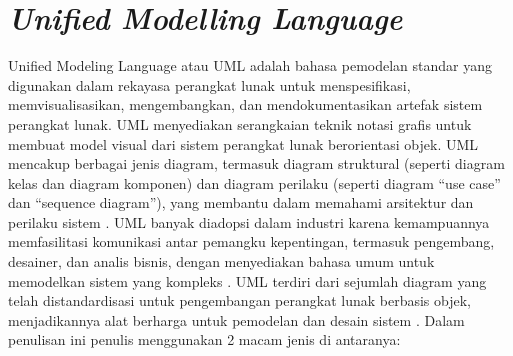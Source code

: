 \section{\textit{Unified Modelling Language}}
Unified Modeling Language atau UML adalah bahasa pemodelan standar yang digunakan dalam rekayasa perangkat lunak untuk menspesifikasi, memvisualisasikan, mengembangkan, dan mendokumentasikan artefak sistem perangkat lunak. UML menyediakan serangkaian teknik notasi grafis untuk membuat model visual dari sistem perangkat lunak berorientasi objek. UML mencakup berbagai jenis diagram, termasuk diagram struktural (seperti diagram kelas dan diagram komponen) dan diagram perilaku (seperti diagram ``use case'' dan ``sequence diagram''), yang membantu dalam memahami arsitektur dan perilaku sistem \citep{huzar2005uml}.
\singlespacing{}
UML banyak diadopsi dalam industri karena kemampuannya memfasilitasi komunikasi antar pemangku kepentingan, termasuk pengembang, desainer, dan analis bisnis, dengan menyediakan bahasa umum untuk memodelkan sistem yang kompleks \citep{huzar2005uml}.
\singlespacing{}
UML terdiri dari sejumlah diagram yang telah distandardisasi untuk pengembangan perangkat lunak berbasis objek, menjadikannya alat berharga untuk pemodelan dan desain sistem \citep{weriza2022development}. Dalam penulisan ini penulis menggunakan 2 macam jenis di antaranya:

